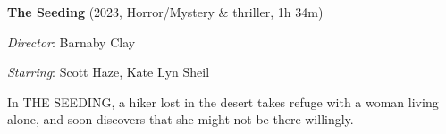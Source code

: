 \textbf{The Seeding} (2023, Horror/Mystery \& thriller, 1h 34m)

\textit{Director}: Barnaby Clay

\textit{Starring}: Scott Haze, Kate Lyn Sheil

In THE SEEDING, a hiker lost in the desert takes refuge with a woman living alone, and soon discovers that she might not be there willingly.